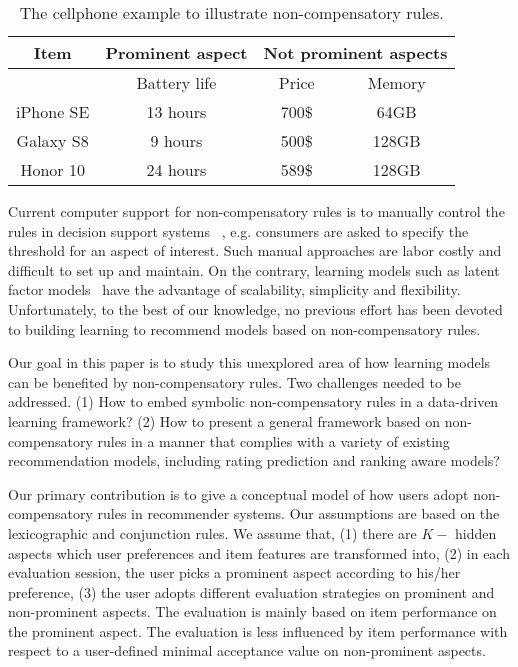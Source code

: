 \documentclass[letterpaper]{article} %
\begin{document}
\begin{table}[htp]\label{tab:rules}
\caption{The cellphone example to illustrate non-compensatory rules.}
\begin{center}
\begin{tabular}{|c|c|c|c|}
\hline
Item & Prominent aspect & \multicolumn{2}{|c|}{Not prominent aspects}\\\hline
& Battery life &  Price & Memory \\\hline
iPhone SE &  13 hours & 700$\$$ & 64GB  \\\hline
Galaxy S8 & 9 hours& 500$\$$  & 128GB \\\hline
Honor 10 & 24 hours& 589$\$$ & 128GB \\\hline
\end{tabular}
\end{center}
\label{tab:example}
\end{table}%

Current computer support for non-compensatory rules is to manually control the rules in decision support systems~\cite{Lee2009Transforming} , e.g. consumers are asked to specify the threshold for an aspect of interest. Such manual approaches are labor costly and difficult to set up and maintain. On the contrary, learning models such as latent factor models~\cite{Koren2009Matrix} have the advantage of scalability, simplicity and flexibility. Unfortunately, to the best of our knowledge, no previous effort has been devoted to building learning to recommend models based on non-compensatory rules. 

Our goal in this paper is to study this unexplored area of how learning models can be benefited by non-compensatory rules. Two challenges needed to be addressed. (1) How to embed symbolic non-compensatory rules in a data-driven learning framework? (2) How to present a general framework based on non-compensatory rules in a manner that complies with a variety of existing recommendation models, including rating prediction and ranking aware models?  

Our primary contribution is to give a conceptual model of how users adopt non-compensatory rules in recommender systems. Our assumptions are based on the lexicographic and conjunction rules. We assume that, (1) there are $K-$ hidden aspects which  user preferences and item features are transformed into, (2) in each evaluation session, the user picks a prominent aspect according to his/her preference, (3) the user adopts different evaluation strategies on prominent and non-prominent aspects. The evaluation is mainly based on item performance on the prominent aspect. The evaluation is less influenced by item performance with respect to a user-defined minimal acceptance value on non-prominent aspects.
\end{document}
